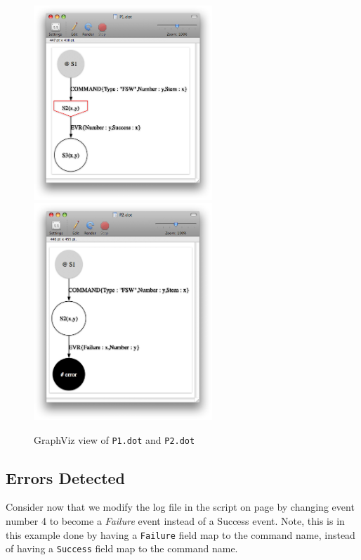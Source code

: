 \documentclass{report}
\begin{document}
\begin{figure}
\begin{center}
\includegraphics[width=0.6\textwidth]{graphics/P1dot}
\includegraphics[width=0.6\textwidth]{graphics/P2dot}
\caption{GraphViz view of {\tt P1.dot} and {\tt P2.dot}}
\label{fig:viz_P1_P2}
\end{center}
\end{figure}

\subsection{Errors Detected}

Consider now that we modify the log file in the script on page \pageref{script} 
by changing event number 4 to become a {\em Failure} event instead
of a {Success} event. Note, this is in this example done by  having 
a {\tt Failure} field map to the command name, instead of having
a {\tt Success} field map to the command name. 
\end{document}
